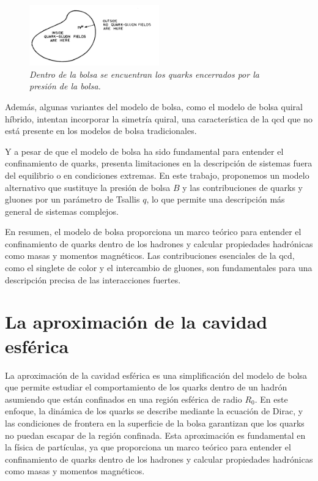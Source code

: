 \begin{figure}
    \centering
    \includegraphics[width=0.5\textwidth]{./Images/Bag model BC.png}
    \caption[Diagrama de bolsa con condiciones de frontera]{\emph{Dentro de la bolsa se encuentran los quarks encerrados por la presión de la bolsa.}}
    \label{fig: Bolsa BC}
\end{figure}

Además, algunas variantes del modelo de bolsa, como el modelo de bolsa quiral híbrido, intentan incorporar la simetría quiral, una característica de la \acrshort{qcd} que no está presente en los modelos de bolsa tradicionales.%

Y a pesar de que el modelo de bolsa ha sido fundamental para entender el confinamiento de quarks, presenta limitaciones en la descripción de sistemas fuera del equilibrio o en condiciones extremas. En este trabajo, proponemos un modelo alternativo que sustituye la presión de bolsa $B$ y las contribuciones de quarks y gluones por un parámetro de Tsallis $q$, lo que permite una descripción más general de sistemas complejos.

En resumen, el modelo de bolsa proporciona un marco teórico para entender el confinamiento de quarks dentro de los hadrones y calcular propiedades hadrónicas como masas y momentos magnéticos. Las contribuciones esenciales de la \acrshort{qcd}, como el singlete de color y el intercambio de gluones, son fundamentales para una descripción precisa de las interacciones fuertes.

\section{La aproximación de la cavidad esférica}

La aproximación de la cavidad esférica es una simplificación del modelo de bolsa que permite estudiar el comportamiento de los quarks dentro de un hadrón asumiendo que están confinados en una región esférica de radio ${R}_{0}$. En este enfoque, la dinámica de los quarks se describe mediante la ecuación de Dirac, y las condiciones de frontera en la superficie de la bolsa garantizan que los quarks no puedan escapar de la región confinada. Esta aproximación es fundamental en la física de partículas, ya que proporciona un marco teórico para entender el confinamiento de quarks dentro de los hadrones y calcular propiedades hadrónicas como masas y momentos magnéticos.

